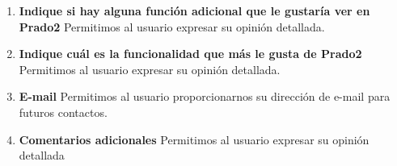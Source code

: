 \begin{enumerate}


  \item \textbf{Indique si hay alguna función adicional que le gustaría ver en Prado2} Permitimos al usuario expresar su opinión detallada.


  \item \textbf{Indique cuál es la funcionalidad que más le gusta de Prado2} Permitimos al usuario expresar su opinión detallada.


  \item \textbf{E-mail} Permitimos al usuario proporcionarnos su dirección de e-mail para futuros contactos.


  \item \textbf{Comentarios adicionales} Permitimos al usuario expresar su opinión detallada


\end{enumerate}

